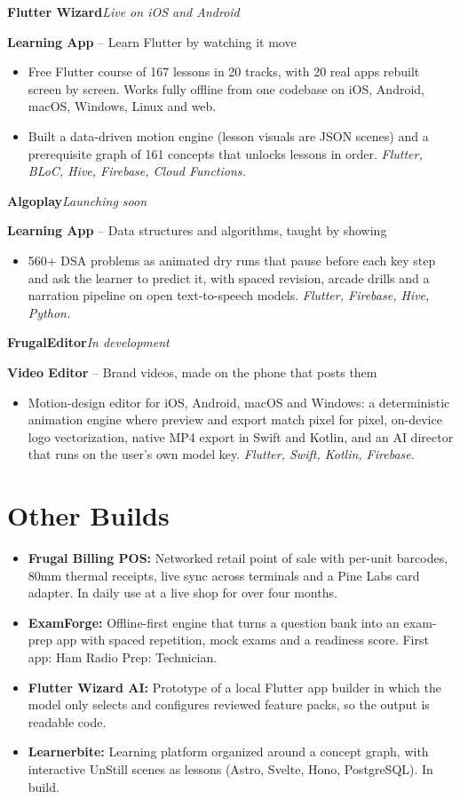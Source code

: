 \documentclass[10pt,a4paper]{article}
\newcommand{\role}[2]{\needspace{4\baselineskip}\textbf{\color{navy}#1}\hfill\textit{#2}\par}
\newcommand{\org}[2]{\textbf{#1}#2\par}
\newcommand{\gap}{\vspace{6.5pt}}
\renewcommand{\b}[1]{\textbf{#1}}
\newcommand{\stack}[1]{\textit{#1}}
\begin{document}
\role{Flutter Wizard}{Live on iOS and Android}
\org{Learning App}{ – Learn Flutter by watching it move}
\begin{itemize}
\item Free Flutter course of 167 lessons in 20 tracks, with 20 real apps rebuilt screen by screen. Works fully offline from one codebase on iOS, Android, macOS, Windows, Linux and web.
\item Built a data-driven motion engine (lesson visuals are JSON scenes) and a prerequisite graph of 161 concepts that unlocks lessons in order. \stack{Flutter, BLoC, Hive, Firebase, Cloud Functions.}
\end{itemize}
\gap

\role{Algoplay}{Launching soon}
\org{Learning App}{ – Data structures and algorithms, taught by showing}
\begin{itemize}
\item 560+ DSA problems as animated dry runs that pause before each key step and ask the learner to predict it, with spaced revision, arcade drills and a narration pipeline on open text-to-speech models. \stack{Flutter, Firebase, Hive, Python.}
\end{itemize}
\gap

\role{FrugalEditor}{In development}
\org{Video Editor}{ – Brand videos, made on the phone that posts them}
\begin{itemize}
\item Motion-design editor for iOS, Android, macOS and Windows: a deterministic animation engine where preview and export match pixel for pixel, on-device logo vectorization, native MP4 export in Swift and Kotlin, and an AI director that runs on the user's own model key. \stack{Flutter, Swift, Kotlin, Firebase.}
\end{itemize}

\section{Other Builds}
\begin{itemize}
\item \b{Frugal Billing POS:} Networked retail point of sale with per-unit barcodes, 80mm thermal receipts, live sync across terminals and a Pine Labs card adapter. In daily use at a live shop for over four months.
\item \b{ExamForge:} Offline-first engine that turns a question bank into an exam-prep app with spaced repetition, mock exams and a readiness score. First app: Ham Radio Prep: Technician.
\item \b{Flutter Wizard AI:} Prototype of a local Flutter app builder in which the model only selects and configures reviewed feature packs, so the output is readable code.
\item \b{Learnerbite:} Learning platform organized around a concept graph, with interactive UnStill scenes as lessons (Astro, Svelte, Hono, PostgreSQL). In build.
\end{itemize}
\end{document}
